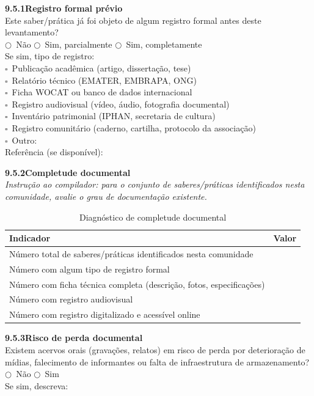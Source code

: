 \noindent\textbf{9.5.1\quad Registro formal prévio}\\[2pt]
Este saber/prática já foi objeto de algum registro formal antes deste levantamento?\\
$\bigcirc$~Não \quad $\bigcirc$~Sim, parcialmente \quad $\bigcirc$~Sim, completamente\\[2pt]
Se sim, tipo de registro:\\
$\square$~Publicação acadêmica (artigo, dissertação, tese)\\
$\square$~Relatório técnico (EMATER, EMBRAPA, ONG)\\
$\square$~Ficha WOCAT ou banco de dados internacional\\
$\square$~Registro audiovisual (vídeo, áudio, fotografia documental)\\
$\square$~Inventário patrimonial (IPHAN, secretaria de cultura)\\
$\square$~Registro comunitário (caderno, cartilha, protocolo da associação)\\
$\square$~Outro: \dotfill\\[2pt]
Referência (se disponível): \dotfill

\medskip\noindent\textbf{9.5.2\quad Completude documental}\\[2pt]
\textit{Instrução ao compilador: para o conjunto de saberes/práticas identificados nesta comunidade, avalie o grau de documentação existente.}

\begin{table}[htbp]
\centering\small
\caption{Diagnóstico de completude documental}
\label{tab:app_completude}
\begin{tabular}{p{9cm}c}
\toprule
\textbf{Indicador} & \textbf{Valor} \\
\midrule
Número total de saberes/práticas identificados nesta comunidade & \\
Número com algum tipo de registro formal & \\
Número com ficha técnica completa (descrição, fotos, especificações) & \\
Número com registro audiovisual & \\
Número com registro digitalizado e acessível online & \\
\bottomrule
\end{tabular}
\end{table}

\medskip\noindent\textbf{9.5.3\quad Risco de perda documental}\\[2pt]
Existem acervos orais (gravações, relatos) em risco de perda por deterioração de mídias, falecimento de informantes ou falta de infraestrutura de armazenamento?\\
$\bigcirc$~Não \quad $\bigcirc$~Sim\\[2pt]
Se sim, descreva: \dotfill

